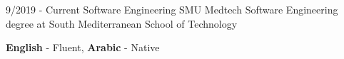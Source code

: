 \documentclass[9pt]{developercv} %
\begin{document}
\vspace{-10 pt}
\begin{entrylist}
	\entry
		{9/2019 - Current}
		{Software Engineering}
		{SMU Medtech}
		{Software Engineering degree at South Mediterranean School of Technology}
\end{entrylist}

\vspace{-10 pt}
    \vspace{-6pt}
    
    \hspace{26mm} \textbf{English} - Fluent, \textbf{ Arabic} - Native

\end{document}
